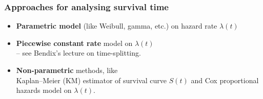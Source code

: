 \documentclass[handout,12pt]{beamer}
\begin{document}
\begin{frame}
\frametitle{Approaches for analysing survival time}

\begin{itemize}
\item 
\textbf{Parametric model} (like Weibull, gamma, etc.) on hazard rate $\lambda(t)$  
\item 
\textbf{Piecewise constant rate} model on $\lambda(t)$ \\ 
-- see Bendix's lecture on time-splitting. 
\medskip
\pause
\item 
\textbf{Non-parametric} methods, 
like \\ Kaplan--Meier (KM) %
estimator of survival curve $S(t)$ and Cox %
proportional hazards model on $\lambda(t)$.

\end{itemize}

\end{frame}
 
\end{document}
